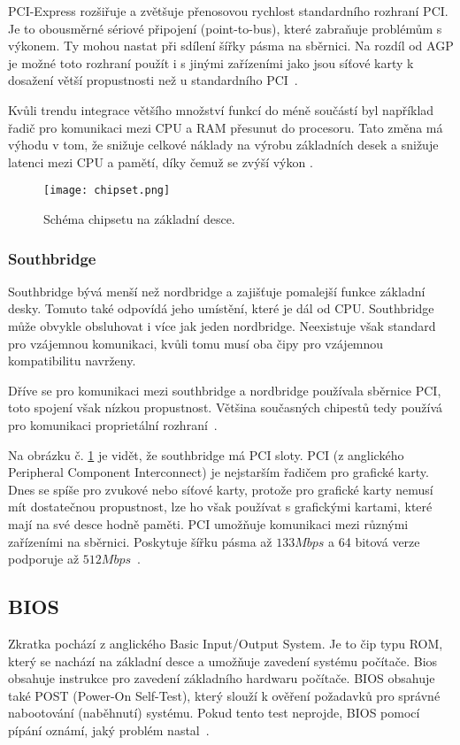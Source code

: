 PCI-Express rozšiřuje a zvětšuje přenosovou rychlost standardního
rozhraní PCI. Je to obousměrné sériové připojení (point-to-bus),
které zabraňuje
problémům s výkonem. Ty mohou nastat při sdílení šířky
pásma na sběrnici. Na rozdíl od AGP je možné toto rozhraní
použít i s jinými zařízeními jako jsou
síťové karty k dosažení větší propustnosti než u standardního
PCI~\cite{ref:mb:onlinecomputertips}.

Kvůli trendu integrace většího množství funkcí do méně součástí byl například
řadič pro komunikaci mezi CPU a RAM přesunut do procesoru.
Tato změna má výhodu v tom, že snižuje celkové
náklady na výrobu základních desek a snižuje latenci mezi
CPU a pamětí, díky čemuž se zvýší výkon \cite{ref:mb:srgtech}.

\begin{figure}[htbp]
  \centering
  \texttt{[image: chipset.png]}
  \caption{Schéma chipsetu na základní desce.~\cite{ref:mb:technologyuk}}
  \label{fig:chipset}
\end{figure}

\subsubsection{Southbridge}
Southbridge bývá menší než nordbridge a zajišťuje pomalejší funkce základní desky.
Tomuto také odpovídá jeho umístění, které je dál od CPU. Southbridge může
obvykle obsluhovat i více jak jeden nordbridge. Neexistuje však standard pro
vzájemnou komunikaci, kvůli tomu musí oba čipy pro vzájemnou kompatibilitu navrženy.

Dříve se pro komunikaci mezi southbridge a nordbridge používala sběrnice PCI,
toto spojení však nízkou propustnost. Většina současných chipestů tedy používá
pro komunikaci proprietální rozhraní~\cite{ref:mb:edusoft}.

Na obrázku č. \ref{fig:chipset} je vidět, že southbridge má PCI sloty. PCI
(z anglického Peripheral Component Interconnect) je nejstarším řadičem
pro grafické karty. Dnes se spíše pro zvukové nebo síťové karty, protože
pro grafické karty nemusí mít dostatečnou propustnost, lze ho však používat s grafickými kartami, které mají na své desce hodně paměti. PCI umožňuje komunikaci mezi
různými zařízeními na sběrnici. Poskytuje šířku pásma až $133 Mbps$ a 64 bitová
verze podporuje až $512 Mbps$~\cite{ref:mb:edusoft}.


\subsection{BIOS}
Zkratka pochází z anglického Basic Input/Output System. Je to čip typu ROM,
který se nachází na základní desce a umožňuje zavedení systému počítače.
Bios obsahuje instrukce pro zavedení základního hardwaru počítače. BIOS
obsahuje také POST (Power-On Self-Test), který slouží k ověření požadavků
pro správné nabootování (naběhnutí) systému. Pokud tento test neprojde, BIOS
pomocí pípání oznámí, jaký problém nastal~\cite{ref:mb:techtarget}.

